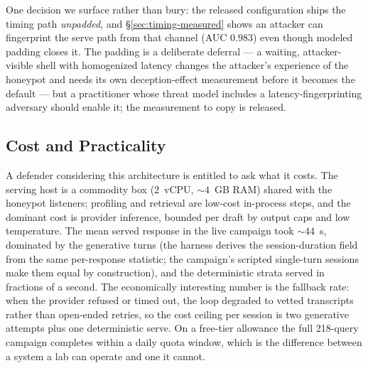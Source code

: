 One decision we surface rather than bury: the released configuration
ships the timing path \emph{unpadded}, and \S\ref{sec:timing-measured}
shows an attacker can fingerprint the serve path from that channel
(AUC $0.983$) even though modeled padding closes it. The padding
is a deliberate deferral --- a waiting, attacker-visible shell with
homogenized latency changes the attacker's experience of the honeypot
and needs its own deception-effect measurement before it becomes the
default --- but a practitioner whose threat model includes a
latency-fingerprinting adversary should enable it; the measurement
to copy is released.

\subsection{Cost and Practicality}
A defender considering this architecture is entitled to ask what it costs.
The serving host is a commodity box (2~vCPU, ${\sim}4$~GB RAM) shared with
the honeypot listeners; profiling and retrieval are low-cost in-process
steps, and the dominant cost is provider inference, bounded per draft by
output caps and low temperature. The mean served response in the live campaign took
${\sim}44$~s, dominated by the generative turns (the harness derives
the session-duration field from the same per-response statistic; the
campaign's scripted single-turn sessions make them equal by
construction), and the
deterministic strata served in fractions of a second. The economically
interesting number is the fallback rate: when the provider refused or
timed out, the loop degraded to vetted transcripts rather than
open-ended retries, so the cost ceiling per session is two generative
attempts plus one deterministic serve. On a free-tier allowance the full
218-query campaign completes within a daily quota window, which is the
difference between a system a lab can operate and one it cannot.

